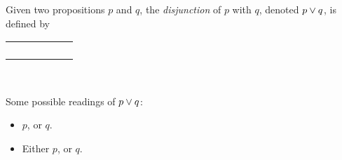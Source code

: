 \begin{definition}[Disjunction]
    \begin{center}
        \begin{minipage}[t]{.55\linewidth}
            Given two propositions $p$ and $q$, the \emph{disjunction} of $p$ with $q$,
            denoted $p \vee q$, is defined by
            \begin{table}[H]
                \centering
                \label{tab:or}
                \begin{tabular}{|CcCc||Cc|}
                    \hline
                     &  &  \\ \hline
                    \thead{$\top$} & \thead{$\top$} &  \\
                    \thead{$\top$} & \thead{$\bot$} &  \\
                    \thead{$\bot$} & \thead{$\top$} &  \\
                    \thead{$\bot$} & \thead{$\bot$} &  \\ \hline
                \end{tabular}
            \end{table}
        \end{minipage}%
        \begin{minipage}[t]{.05\linewidth}
            ~
        \end{minipage}%
        \begin{minipage}[t]{.4\linewidth}
            Some possible readings of $p \vee q$:\\
            \begin{itemize}
                \item[\cdot]
                    $p$, or $q$.
                \item[\cdot]
                    Either $p$, or $q$.
            \end{itemize}
        \end{minipage}
    \end{center}
\end{definition}

